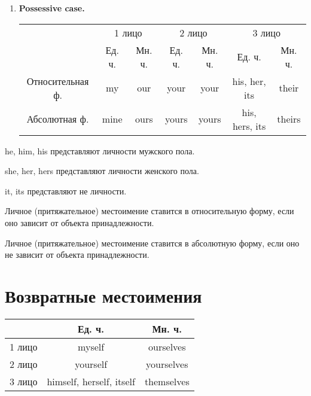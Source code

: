 \documentclass[oneside]{book}
\begin{document}
\begin{enumerate}
    \item \textbf{Possessive case.}
    \begin{center}
        \begin{tabular}{|c|cc|cc|cc|}
            \hline
            \multirow{2}{*}{}& \multicolumn{2}{c|}{1 лицо}         & \multicolumn{2}{c|}{2 лицо}          & \multicolumn{2}{c|}{3 лицо}                  \\ \cline{2-7} 
                             & \multicolumn{1}{c|}{Ед. ч.}& Мн. ч. & \multicolumn{1}{c|}{Ед. ч.} & Мн. ч. & \multicolumn{1}{c|}{Ед. ч.}         & Мн. ч. \\ \hline
            Относительная ф. & \multicolumn{1}{c|}{my}    & our    & \multicolumn{1}{c|}{your}   & your   & \multicolumn{1}{c|}{his, her, its}  & their  \\ \hline
            Абсолютная ф.    & \multicolumn{1}{c|}{mine}  & ours   & \multicolumn{1}{c|}{yours}  & yours  & \multicolumn{1}{c|}{his, hers, its} & theirs \\ \hline
        \end{tabular}
    \end{center}
\end{enumerate}

he, him, his представляют личности мужского пола.

she, her, hers представляют личности женского пола.

it, its представляют не личности.

Личное (притяжательное) местоимение ставится в относительную форму,
если оно зависит от объекта принадлежности.

Личное (притяжательное) местоимение ставится в абсолютную форму,
если оно не зависит от объекта принадлежности.

\section{Возвратные местоимения}
\begin{center}
    \begin{tabular}{|c|c|c|}
        \hline

        & Ед. ч. & Мн. ч.
        \\
        \hline

        1 лицо & myself & ourselves
        \\
        \hline

        2 лицо & yourself & yourselves
        \\
        \hline

        3 лицо & himself, herself, itself & themselves
        \\
        \hline
    \end{tabular}
\end{center}
\end{document}
